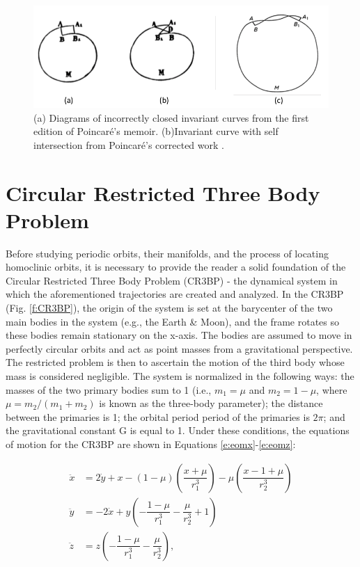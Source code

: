 \documentclass[11pt]{article} %
\begin{document}
\begin{figure}[H]
\centering
\includegraphics[width=5in]{curveIntersection1.png}\nonumber{}
\caption{(a) Diagrams of incorrectly closed invariant curves from the first edition of Poincaré's memoir. (b)Invariant curve with self intersection from Poincaré's corrected work \cite{BarrowGreen1997}.}
\label{fig:curveIntersection1}
\end{figure}

\section{Circular Restricted Three Body Problem}
Before studying periodic orbits, their manifolds, and the process of locating homoclinic orbits, it is necessary to provide the reader a solid foundation of the Circular Restricted Three Body Problem (CR3BP) - the dynamical system in which the aforementioned trajectories are created and analyzed. In the CR3BP (Fig. \ref{f:CR3BP}), the origin of the system is set at the barycenter of the two main bodies in the system (e.g., the Earth \& Moon), and the frame rotates so these bodies remain stationary on the x-axis. The bodies are assumed to move in perfectly circular orbits and act as point masses from a gravitational perspective. The restricted problem is then to ascertain the motion of the third body whose mass is considered negligible. The system is  normalized in the following ways: the masses of the two primary bodies sum to 1 (i.e., $m_1 = \mu$ and $m_2 = 1-\mu$, where $\mu = m_2/(m_1+m_2)$ is known as the three-body parameter); the distance between the primaries is 1; the orbital period period of the primaries is $2\pi$; and the gravitational constant G is equal to 1. Under these conditions, the equations of motion for the CR3BP are shown in Equations \ref{e:eomx}-\ref{e:eomz}:

\begin{align}
	\ddot{x} &= 2\dot{y} + x - (1-\mu)\left(\dfrac{x+\mu}{r_1^3}\right) - \mu\left(\dfrac{x-1+\mu}{r_2^3}\right) \label{e:eomx}\\
	\ddot{y} &= -2\dot{x} + y\left(-\dfrac{1-\mu}{r_1^3} - \dfrac{\mu}{r_2^3} + 1\right) \label{e:eomy}\\
	\ddot{z} &= z\left(-\dfrac{1 - \mu}{r_1^3} - \dfrac{\mu}{r_2^3}\right), \label{e:eomz}
\end{align} 
\end{document}
